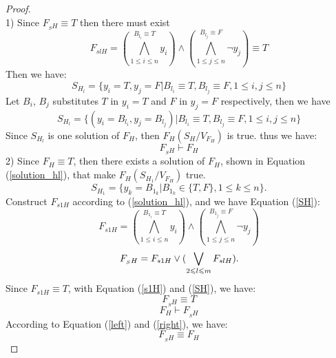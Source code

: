 \documentclass[conference,compsocconf]{IEEEtran}
\begin{document}
\begin{proof} \\
1) Since $F_{_SH} \equiv T$ then there must exist
\begin{equation}
F_{slH}=
(\bigwedge_{1\leqslant i\leqslant n}^{B_{l_i}\equiv T}y_{i})\wedge 
(\bigwedge_{1\leqslant j\leqslant n}^{B_{l_j}\equiv F}\neg y_{j}) \equiv T
\end{equation}
Then we have:
\begin{equation}
S_{H_l}=\{y_{i}=T,y_{j}=F|B_{l_i}\equiv T, B_{l_j}\equiv F, 1\leqslant i, j\leqslant n \} 
\end{equation}
Let $B_i$, $B_j$ substitutes $T$ in $y_{i}=T$ and $F$ in $y_{j}=F$ respectively, then we have
\begin{equation}
S_{H_l}=\{(y_i=B_{l_i},y_j=B_{l_j})|B_{l_i}\equiv T, B_{l_j}\equiv F, 1\leqslant i, j\leqslant n\} 
\end{equation}
Since $S_{H_l}$ is one solution of $F_H$, then  $F_H(S_H/V_{F_H}) $ is true. thus we have:
\begin{equation}\label{left}
 F_{_SH} \vdash F_H
\end{equation}
2) Since $F_H\equiv T$, then there exists a solution of $F_H$,
shown in Equation (\ref{solution_hl}), that make $F_H(S_{H_1}/V_{F_H})$ true.
\begin{equation}\label{solution_hl}
S_{H_1}=\{y_k=B_{1_k}|B_{1_k} \in \{T,F\}, 1\leqslant k\leqslant n\}.
\end{equation}
Construct $F_{s1H}$ according to (\ref{solution_hl}), and we have Equation (\ref{SH}):
\begin{equation}\label{s1H}
F_{s1H}=
(\bigwedge_{1\leqslant i\leqslant n}^{B_{1_i}\equiv T}y_{i})\wedge 
(\bigwedge_{1\leqslant j\leqslant n}^{B_{1_j}\equiv F}\neg y_{j})
\end{equation}
\begin{equation}\label{SH}
F_{_SH} =F_ {s1H} \vee (\bigvee_{2\leqslant l\leqslant m}F_{slH}). \\
\end{equation}
Since $F_{s1H} \equiv T$, with Equation (\ref{s1H}) and (\ref{SH}), we have: 
\begin{equation}
F_{_SH}  \equiv T 
\end{equation}
\begin{equation}\label{right}
F_H \vdash F_{_SH}
\end{equation}
According to Equation (\ref{left}) and (\ref{right}), we have:
\begin{equation}
 F_{_SH} \equiv F_H 
\end{equation}
\end{proof}
\end{document}
